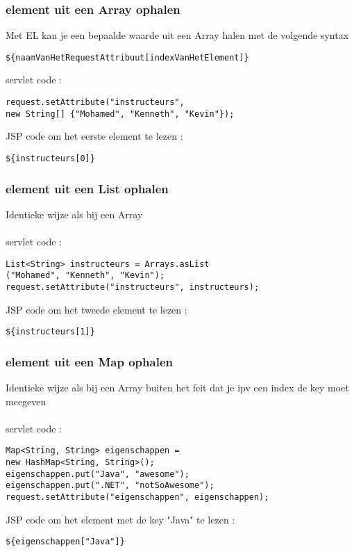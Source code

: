 \documentclass{beamer}
\begin{document}
\begin{frame}[fragile]

\frametitle{element uit een Array ophalen}

Met EL kan je een bepaalde waarde uit een Array halen met de volgende syntax

\begin{verbatim}${naamVanHetRequestAttribuut[indexVanHetElement]}\end{verbatim}

servlet code :

\begin{verbatim}request.setAttribute("instructeurs", 
new String[] {"Mohamed", "Kenneth", "Kevin"});\end{verbatim}

JSP code om het eerste element te lezen :

\begin{verbatim}${instructeurs[0]}\end{verbatim}

\end{frame}


\begin{frame}[fragile]

\frametitle{element uit een List ophalen}

{\large 
Identieke wijze als bij een Array\\~\\

servlet code :

\begin{verbatim}
List<String> instructeurs = Arrays.asList
("Mohamed", "Kenneth", "Kevin");
request.setAttribute("instructeurs", instructeurs);
\end{verbatim}

JSP code om het tweede element te lezen :

\begin{verbatim}
${instructeurs[1]}
\end{verbatim}
}

\end{frame}


\begin{frame}[fragile]

\frametitle{element uit een Map ophalen}

{\large 
Identieke wijze als bij een Array buiten het feit dat je ipv een index de key moet meegeven\\~\\


servlet code :

\begin{verbatim}
Map<String, String> eigenschappen = 
new HashMap<String, String>();
eigenschappen.put("Java", "awesome");
eigenschappen.put(".NET", "notSoAwesome");
request.setAttribute("eigenschappen", eigenschappen);
\end{verbatim}

JSP code om het element met de key "Java" te lezen :

\begin{verbatim}
${eigenschappen["Java"]}
\end{verbatim}
}

\end{frame}
\end{document}
